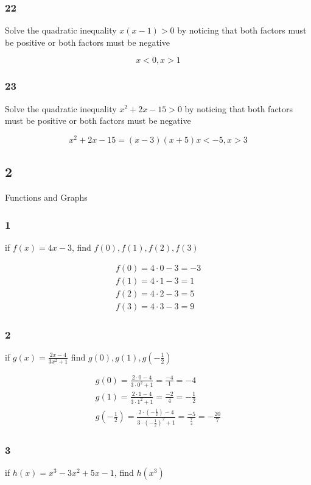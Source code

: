 \documentclass[]{report}
\begin{document}
\subsubsection{22}

Solve the quadratic inequality $x(x-1) > 0$ by noticing that both factors must be positive or both factors must be negative

\[
x < 0 , x > 1
\]

\subsubsection{23}
Solve the quadratic inequality $x^2 + 2x - 15 > 0$ by noticing that both factors must be positive or both factors must be negative

\[
x^2 + 2x - 15  = (x - 3)(x + 5)
x < -5, x > 3
\]

\subsection{2} Functions and Graphs

\subsubsection{1}
if $f(x) = 4x-3$, find $f(0), f(1), f(2), f(3)$

\begin{align*}
f(0) = 4\cdot0 - 3 = -3\\
f(1) = 4\cdot1 - 3 = 1 \\
f(2) = 4\cdot2 - 3 = 5 \\
f(3) = 4\cdot3 - 3 = 9
\end{align*}

\subsubsection{2}
if $g(x) = \frac{2x-4}{3x^2 + 1}$ find $g(0), g(1), g(-\frac{1}{2})$


\begin{align*}
g(0) = \frac{2\cdot0-4}{3\cdot0^2 + 1} = \frac{-4}{1} = -4\\
g(1) = \frac{2\cdot1 - 4}{3\cdot1^2 + 1} = \frac{-2}{4} = -\frac{1}{2}\\
g(-\frac{1}{2}) = \frac{2\cdot(-\frac{1}{2}) - 4}{3\cdot(-\frac{1}{2})^2 + 1} = \frac{-5}{\frac{7}{4}} = -\frac{20}{7}
\end{align*}


\subsubsection{3}
if $h(x) = x^3 - 3x^2 + 5x - 1$, find $h(x^3)$
\end{document}
